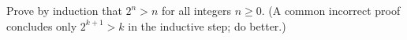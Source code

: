 Prove by induction that $2^n>n$ for all integers $n\ge0$. (A common incorrect proof concludes only $2^{k+1}>k$ in the inductive step; do better.)
